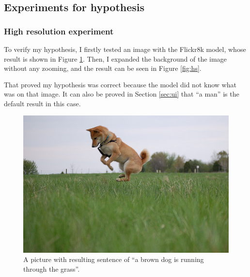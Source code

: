 \documentclass[10pt,twocolumn,letterpaper]{article}
\begin{document}
\subsection{Experiments for hypothesis}
\subsubsection{High resolution experiment} \label{sec:hs}
To verify my hypothesis, I firstly tested an image with the Flickr8k model, whose result is shown in Figure \ref{fig:hsori}.
Then, I expanded the background of the image without any zooming, and the result can be seen in Figure \ref{fig:hs}.

That proved my hypothesis was correct because the model did not know what was on that image.
It can also be proved in Section \ref{sec:ui} that ``a man'' is the default result in this case.

\begin{figure}[t]
    \begin{center}
        \includegraphics[width=0.9\linewidth]{2584487952_f70e5aa9bf_ori.jpg}
    \end{center}
    \caption{A picture with resulting sentence of ``a brown dog is running through the grass''.}
    \label{fig:hsori}
\end{figure}
\end{document}
